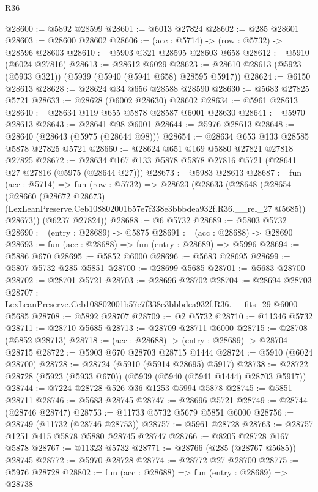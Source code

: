 \begin{lexlean}{R36}
\begin{coremodule}
@28600 := @5892 @28599
@28601 := @6013 @27824
@28602 := @285 @28601
@28603 := @28600 @28602
@28606 := (acc : @5714) -> (row : @5732) -> @28596 @28603
@28610 := @5903 @321 @28595 @28603 @658
@28612 := @5910 (@6024 @27816)
@28613 := @28612 @6029
@28623 := @28610 @28613 (@5923 (@5933 @321)) (@5939 (@5940 (@5941 @658) @28595 @5917))
@28624 := @6150 @28613
@28628 := @28624 @34 @656 @28588 @28590
@28630 := @5683 @27825 @5721
@28633 := @28628 (@6002 @28630) @28602
@28634 := @5961 @28613
@28640 := @28634 @119 @655 @5878 @28587 @6001 @28630
@28641 := @5970 @28613
@28643 := @28641 @98 @6001
@28644 := @5976 @28613
@28648 := @28640 (@28643 (@5975 (@28644 @98)))
@28654 := @28634 @653 @133 @28585 @5878 @27825 @5721
@28660 := @28624 @651 @169 @5880 @27821 @27818 @27825
@28672 := @28634 @167 @133 @5878 @5878 @27816 @5721 (@28641 @27 @27816 (@5975 (@28644 @27)))
@28673 := @5983 @28613
@28687 := fun (acc : @5714) =>
  fun (row : @5732) =>
  @28623
    (@28633
      (@28648
        (@28654
          (@28660
            (@28672 @28673)
            (LexLeanPreserve.Ceb108802001b57e7f338e3bbbdea932f.R36.__rel_27 @5685))
          @28673))
      (@6237 @27824))
@28688 := @6 @5732
@28689 := @5803 @5732
@28690 := (entry : @28689) -> @5875
@28691 := (acc : @28688) -> @28690
@28693 := fun (acc : @28688) => fun (entry : @28689) => @5996
@28694 := @5886 @670
@28695 := @5852 @6000
@28696 := @5683 @28695
@28699 := @5807 @5732 @285 @5851
@28700 := @28699 @5685
@28701 := @5683 @28700
@28702 := @28701 @5721
@28703 := @28696 @28702
@28704 := @28694 @28703
@28707 := LexLeanPreserve.Ceb108802001b57e7f338e3bbbdea932f.R36.__fits_29 @6000 @5685
@28708 := @5892 @28707
@28709 := @2 @5732
@28710 := @11346 @5732
@28711 := @28710 @5685
@28713 := @28709 @28711 @6000
@28715 := @28708 (@5852 @28713)
@28718 := (acc : @28688) -> (entry : @28689) -> @28704 @28715
@28722 := @5903 @670 @28703 @28715 @1444
@28724 := @5910 (@6024 @28700)
@28728 := @28724 (@5910 (@5914 @28695) @5917)
@28738 := @28722 @28728 (@5923 (@5933 @670)) (@5939 (@5940 (@5941 @1444) @28703 @5917))
@28744 := @7224 @28728 @526 @36 @1253 @5994 @5878
@28745 := @5851 @28711
@28746 := @5683 @28745
@28747 := @28696 @5721
@28749 := @28744 (@28746 @28747)
@28753 := @11733 @5732 @5679 @5851 @6000
@28756 := @28749 (@11732 (@28746 @28753))
@28757 := @5961 @28728
@28763 := @28757 @1251 @415 @5878 @5880 @28745 @28747
@28766 := @8205 @28728 @167 @5878
@28767 := @11323 @5732
@28771 := @28766 (@285 (@28767 @5685)) @28745
@28772 := @5970 @28728
@28774 := @28772 @27 @28700
@28775 := @5976 @28728
@28802 := fun (acc : @28688) =>
  fun (entry : @28689) =>
  @28738

\end{coremodule}
\end{lexlean}
